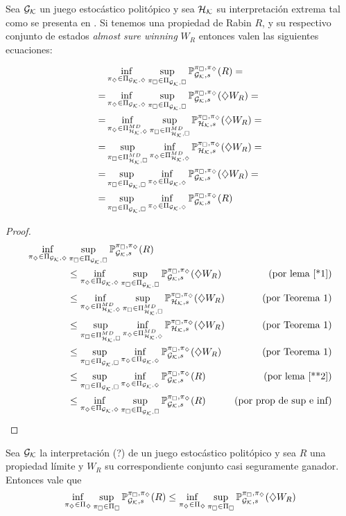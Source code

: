 \begin{theorem}
	Sea $\Gk$ un juego estocástico politópico y sea $\Hk$ su interpretación extrema tal como se presenta en \cite{Polytopal}. Si tenemos una propiedad de Rabin $R$, y su respectivo conjunto de estados \textit{almost sure winning} $W_R$ entonces valen las siguientes ecuaciones:

	\begin{align*}
		&\inf_{\piGdiam} \sup_{\piGcuad} \ProbG(R) = \\
		= &\inf_{\piGdiam} \sup_{\piGcuad} \ProbG(\alc W_R) = \\
		= &\inf_{\piHdiamMD} \sup_{\piHcuadMD} \ProbH(\alc W_R) = \\
		= &\sup_{\piHcuadMD} \inf_{\piHdiamMD} \ProbH(\alc W_R) = \\
		= &\sup_{\piGcuad} \inf_{\piGdiam} \ProbG(\alc W_R) = \\
		= &\sup_{\piGcuad} \inf_{\piGdiam} \ProbG(R)
	\end{align*}

\end{theorem}

\begin{proof}
	\begin{align*}
		\inf_{\piGdiam} &\sup_{\piGcuad} \ProbG(R) \\
		&\leq \inf_{\piGdiam} \sup_{\piGcuad} \ProbG(\alc W_R)
		& \text{(por lema \ref{*1})}
		\\
		&\leq \inf_{\piHdiamMD} \sup_{\piHcuadMD} \ProbH(\alc W_R)
		& \text{(por Teorema 1)}
		\\
		&\leq \sup_{\piHcuadMD} \inf_{\piHdiamMD} \ProbH(\alc W_R)
		& \text{(por Teorema 1)}
		\\
		&\leq \sup_{\piGcuad} \inf_{\piGdiam} \ProbG(\alc W_R)
		& \text{(por Teorema 1)}
		\\
		&\leq \sup_{\piGcuad} \inf_{\piGdiam} \ProbG(R)
		& \text{(por lema \ref{**2})}
		\\
		&\leq \inf_{\piGdiam} \sup_{\piGcuad} \ProbG(R)
		& \text{(por prop de sup e inf)}
	\end{align*}
\end{proof}

\begin{lemma}
	\label{*1}
	Sea $\Gk$ la interpretación (?) de un juego estocástico politópico y sea $R$ una propiedad límite y $W_R$ su correspondiente conjunto casi seguramente ganador. Entonces vale que
	$$
		\inf_{\pidiamset} \sup_{\picuadset} \ProbG (R) \leq \inf_{\pidiamset} \sup_{\picuadset} \ProbG (\alc W_R)
	$$
\end{lemma}


